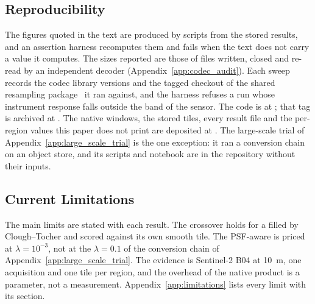 \subsection{Reproducibility}
\label{sec:reproducibility}
The figures quoted in the text are produced by scripts from the stored
results, and an assertion harness recomputes them and fails when the
text does not carry a value it computes. The
sizes reported are those of files written, closed and re-read by an
independent decoder (Appendix~\ref{app:codec_audit}). Each sweep
records the codec library versions and the tagged checkout of the
shared resampling package~\cite{delouis2026resample} it ran against,
and the harness refuses a run whose instrument response falls outside
the band of the sensor. The code is at \repourl; that tag is archived
at \codedoi. The native windows, the stored tiles, every result file
and the per-region values this paper does not print are deposited at
\datadoi. The large-scale trial of Appendix~\ref{app:large_scale_trial}
is the one exception: it ran a conversion chain on an object store,
and its scripts and notebook are in the repository without their
inputs.

\subsection{Current Limitations}
\label{sec:limitations}
The main limits are stated with each result. The crossover holds for a
 filled by Clough--Tocher and scored against its own
smooth tile. The PSF-aware  is priced at
$\lambda=10^{-3}$, not at the $\lambda=0.1$ of the conversion chain of
Appendix~\ref{app:large_scale_trial}. The evidence is Sentinel-2 B04 at
\SI{10}{m}, one acquisition and one tile per region, and the overhead of
the native product is a parameter, not a measurement.
Appendix~\ref{app:limitations} lists every limit with its section.
